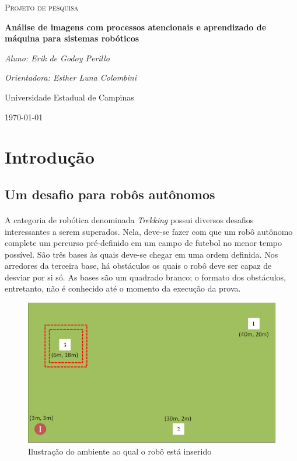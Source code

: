 \documentclass[11pt]{report}
\newcommand{\tit}[1]{\textit{#1}}
\begin{document}
\begin{titlepage}
	\centering
	{\scshape\Large Projeto de pesquisa\par}
	\vspace{1.5cm}
	{\huge\bfseries Análise de imagens com processos atencionais e 
		aprendizado de máquina para sistemas robóticos\par}
	\vspace{2cm}
	{\Large\itshape Aluno: Erik de Godoy Perillo\par}
	{\Large\itshape Orientadora: Esther Luna Colombini\par}
	\vfill
	Universidade Estadual de Campinas 
	\vfill
	{\large \today\par}
\end{titlepage}

\newpage

\section{Introdução}

\subsection{Um desafio para robôs autônomos}
\paragraph{}
A categoria de robótica denominada \tit{Trekking} possui diversos desafios 
interessantes a serem superados. 
Nela, deve-se fazer com que um robô autônomo complete um percurso pré-definido 
em um campo de futebol no menor tempo possível. 
São três bases às quais deve-se chegar em uma ordem definida. 
Nos arredores da terceira base, há obstáculos os quais o robô deve ser capaz 
de desviar por si só. 
As bases são um quadrado branco; o formato dos obstáculos, entretanto, não é
conhecido até o momento da execução da prova.

\begin{figure}[H]
	\centering
	\includegraphics[width=0.8\linewidth]{imgs/trekking_campo.png}
	\caption{Ilustração do ambiente ao qual o robô está inserido}
\end{figure}
\end{document}
